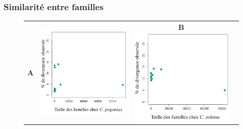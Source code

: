 \documentclass[12pt,a4paper]{article}
\begin{document}
			\subsubsection{Similarité entre familles}
\begin{figure}	
	\begin{tabular}{cccc} 
		\textbf{A} & \includegraphics[scale=0.3]{img/similarity_pogonias.png} & \textbf{B} \includegraphics[scale=0.3]{img/similarity_solatus.png} \\

\end{tabular}
\end{figure}
\end{document}
